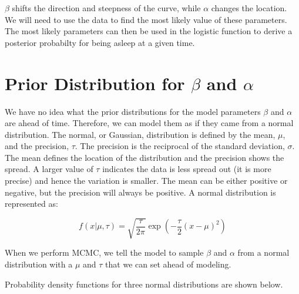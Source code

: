 \documentclass[12pt]{article}
\begin{document}
    \(\beta\) shifts the direction and steepness of the curve, while
\(\alpha\) changes the location. We will need to use the data to find
the most likely value of these parameters. The most likely parameters
can then be used in the logistic function to derive a posterior
probabilty for being asleep at a given time.

    \section{\texorpdfstring{Prior Distribution for \(\beta\) and
\(\alpha\)}{Prior Distribution for \textbackslash{}beta and \textbackslash{}alpha}}\label{prior-distribution-for-beta-and-alpha}

We have no idea what the prior distributions for the model parameters
\(\beta\) and \(\alpha\) are ahead of time. Therefore, we can model them
as if they came from a normal distribution. The normal, or Gaussian,
distribution is defined by the mean, \(\mu\), and the precision,
\(\tau\). The precision is the reciprocal of the standard deviation,
\(\sigma\). The mean defines the location of the distribution and the
precision shows the spread. A larger value of \(\tau\) indicates the
data is less spread out (it is more precise) and hence the variation is
smaller. The mean can be either positive or negative, but the precision
will always be positive. A normal distribution is represented as:

\[ f(x | \mu, \tau) = \sqrt{\frac{\tau}{2\pi}} \exp\left( -\frac{\tau}{2} (x - \mu)^2 \right) \]

    When we perform MCMC, we tell the model to sample \(\beta\) and
\(\alpha\) from a normal distribution with a \(\mu\) and \(\tau\) that
we can set ahead of modeling.

Probability density functions for three normal distributions are shown
below.
\end{document}
